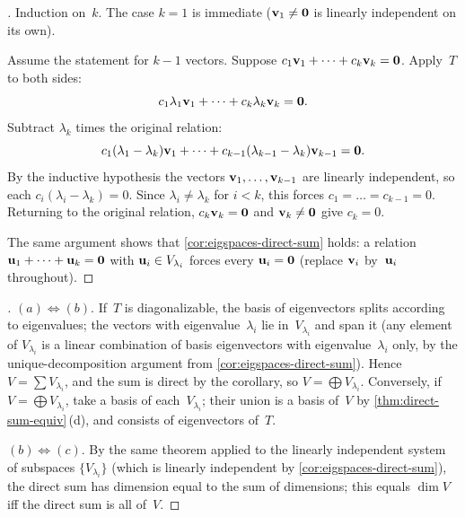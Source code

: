 \begin{proof}[]
Induction on~$k$. The case $k = 1$ is immediate ($\mathbf{v}_1 \neq \mathbf{0}$
is linearly independent on its own).

Assume the statement for $k - 1$ vectors. Suppose
$c_1 \mathbf{v}_1 + \dots + c_k \mathbf{v}_k = \mathbf{0}$. Apply~$T$ to
both sides:
\[
  c_1 \lambda_1 \mathbf{v}_1 + \dots + c_k \lambda_k \mathbf{v}_k = \mathbf{0}.
\]
Subtract $\lambda_k$ times the original relation:
\[
  c_1 (\lambda_1 - \lambda_k) \mathbf{v}_1 + \dots + c_{k-1}(\lambda_{k-1} - \lambda_k) \mathbf{v}_{k-1} = \mathbf{0}.
\]
By the inductive hypothesis the vectors $\mathbf{v}_1, \dots, \mathbf{v}_{k-1}$
are linearly independent, so each $c_i (\lambda_i - \lambda_k) = 0$.
Since $\lambda_i \neq \lambda_k$ for $i < k$, this forces
$c_1 = \dots = c_{k-1} = 0$. Returning to the original relation,
$c_k \mathbf{v}_k = \mathbf{0}$ and $\mathbf{v}_k \neq \mathbf{0}$ give
$c_k = 0$.

The same argument shows that
\cref{cor:eigspaces-direct-sum} holds: a relation
$\mathbf{u}_1 + \dots + \mathbf{u}_k = \mathbf{0}$ with
$\mathbf{u}_i \in V_{\lambda_i}$ forces every $\mathbf{u}_i = \mathbf{0}$
(replace $\mathbf{v}_i$ by~$\mathbf{u}_i$ throughout).
\end{proof}

\begin{proof}[]
$(a) \Leftrightarrow (b)$. If~$T$ is diagonalizable, the basis of
eigenvectors splits according to eigenvalues; the vectors with
eigenvalue~$\lambda_i$ lie in~$V_{\lambda_i}$ and span it (any element of
$V_{\lambda_i}$ is a linear combination of basis eigenvectors with
eigenvalue~$\lambda_i$ only, by the unique-decomposition argument from
\cref{cor:eigspaces-direct-sum}). Hence
$V = \sum V_{\lambda_i}$, and the sum is direct by the corollary, so
$V = \bigoplus V_{\lambda_i}$. Conversely, if
$V = \bigoplus V_{\lambda_i}$, take a basis of each~$V_{\lambda_i}$;
their union is a basis of~$V$ by
\cref{thm:direct-sum-equiv}\,(d), and consists of eigenvectors of~$T$.

$(b) \Leftrightarrow (c)$. By the same theorem applied to the
linearly independent system of subspaces $\{V_{\lambda_i}\}$ (which is
linearly independent by \cref{cor:eigspaces-direct-sum}), the
direct sum has dimension equal to the sum of dimensions; this equals
$\dim V$ iff the direct sum is all of~$V$.
\end{proof}

